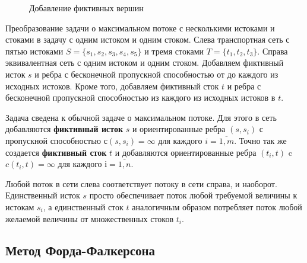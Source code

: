 \documentclass[a4paper,12pt]{article}
\begin{document}
\begin{figure}[!h]
	\caption{Добавление фиктивных вершин}
\end{figure}

Преобразование задачи о максимальном потоке с несколькими истоками и стоками в задачу с одним истоком и одним стоком. Слева транспортная сеть с пятью истоками $S = \{ s_1, s_2, s_3, s_4, s_5 \}$ и тремя стоками $T = \{ t_1, t_2, t_3 \}$. Справа эквивалентная сеть с одним истоком и одним стоком. Добавляем фиктивный исток $s$ и ребра с бесконечной пропускной способностью от до каждого из исходных истоков. Кроме того, добавляем фиктивный сток $t$ и ребра с бесконечной пропускной способностью из каждого из исходных истоков в $t$. 

Задача сведена к обычной задаче о максимальном потоке. Для этого в сеть добавляются \textbf{фиктивный исток} $s$ и ориентированные ребра $(s, s_i)$ с пропускной способностью $с(s, s_i) = \infty$ для каждого $ i = \overline{1,m}$. Точно так же создается \textbf{фиктивный сток} $t$ и добавляются ориентированные ребра $(t_i, t)$ c $c(t_i,t) = \infty$ для каждого $і = \overline{1, n}$.

Любой поток в сети слева соответствует потоку в сети справа, и наоборот. Единственный исток $s$ просто обеспечивает поток любой требуемой величины к истокам $s_i$, а единственный сток $t$ аналогичным образом потребляет поток любой желаемой величины от множественных стоков $t_i$.

\subsection{Метод Форда-Фалкерсона}
\end{document}
